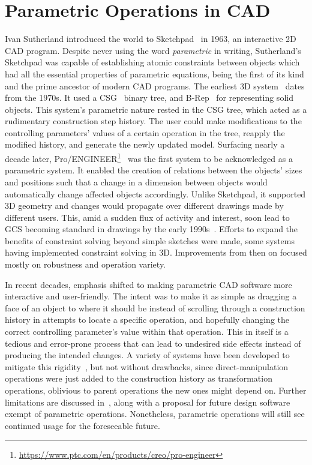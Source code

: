 \section{Parametric Operations in CAD}%
\label{sec:intro.parametric}

Ivan Sutherland introduced the world to
Sketchpad~\cite{Sutherland:1964:Sketchpad} in 1963, an interactive 2D \ac{CAD}
program. Despite never using the word \textit{parametric} in writing,
Sutherland's Sketchpad was capable of establishing atomic constraints between
objects which had all the essential properties of parametric equations, being
the first of its kind and the prime ancestor of modern \ac{CAD} programs.  The
earliest 3D system~\cite{Requicha:1980:RRS:356827.356833} dates from the 1970s.
It used a \ac{CSG}~\cite{Requicha:1977:CSG,Foley:1996:CGPP} binary tree, and
\ac{B-Rep}~\cite{Stroud:2006:BRMT} for representing solid objects.  This
system's parametric nature rested in the \ac{CSG} tree, which acted as a
rudimentary construction step history.  The user could make modifications to the
controlling parameters' values of a certain operation in the tree, reapply the
modified history, and generate the newly updated model.  Surfacing nearly a
decade later,
Pro/ENGINEER\footnote{\url{https://www.ptc.com/en/products/creo/pro-engineer}}~\cite{Jabi:2013:PDA}
was the first system to be acknowledged as a parametric system.  It enabled the
creation of relations between the objects' sizes and positions such that a
change in a dimension between objects would automatically change affected
objects accordingly.  Unlike Sketchpad, it supported 3D geometry and changes
would propagate over different drawings made by different users.  This, amid a
sudden flux of activity and interest, soon lead to \ac{GCS} becoming standard in
drawings by the early
1990s~\cite{Chung:1990:TEVPD,Owen:1991:ASGDC,Bouma:1995:GCS}.  Efforts to expand
the benefits of constraint solving beyond simple sketches were made, some
systems having implemented constraint solving in 3D.  Improvements from then on
focused mostly on robustness and operation variety.

In recent decades, emphasis shifted to making parametric \ac{CAD} software more
interactive and user-friendly.  The intent was to make it as simple as dragging
a face of an object to where it should be instead of scrolling through a
construction history in attempts to locate a specific operation, and hopefully
changing the correct controlling parameter's value within that operation.  This
in itself is a tedious and error-prone process that can lead to undesired
side effects instead of producing the intended changes.  A variety of systems
have been developed to mitigate this
rigidity~\cite{Samuel:2006:CPPUP,Wu:2007:MSMSM,Clarke:2009:SM}, but not without
drawbacks, since direct-manipulation operations were just added to the
construction history as transformation operations, oblivious to parent
operations the new ones might depend on.  Further limitations are discussed
in~\cite{Bettig:2005:LPOSSD}, along with a proposal for future design software
exempt of parametric operations.  Nonetheless, parametric operations will still
see continued usage for the foreseeable future.
